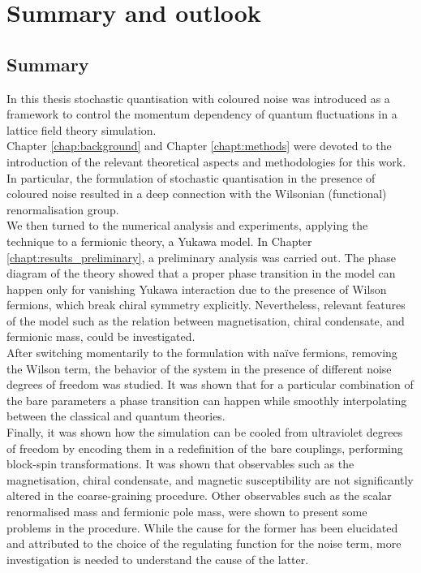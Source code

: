 
\chapter{Summary and outlook}
\label{chap:conclusions}
\section*{Summary}
In this thesis stochastic quantisation with coloured noise was introduced as a framework to control the momentum dependency of quantum fluctuations in a lattice field theory simulation. \\
Chapter \ref{chap:background} and Chapter \ref{chapt:methods} were devoted to the introduction of the relevant theoretical aspects and methodologies for this work. In particular, the formulation 
of stochastic quantisation in the presence of coloured noise resulted in a deep connection with the Wilsonian (functional) renormalisation group. \\
We then turned to the numerical analysis and experiments, applying the technique to a fermionic theory, a Yukawa model. In Chapter \ref{chapt:results_preliminary}, a preliminary analysis was carried out. The phase diagram of the theory showed that a proper phase transition in the model can happen only for vanishing Yukawa interaction due to the presence of Wilson 
fermions, which break chiral symmetry explicitly. Nevertheless, relevant features of the model such as the relation between magnetisation, chiral condensate, and fermionic mass, could be investigated. \\
After switching momentarily to the formulation with na\"ive fermions, removing the Wilson term, the behavior of the system in the presence of different noise degrees of freedom was studied. It was shown that for a particular combination of the bare parameters
a phase transition can happen while smoothly interpolating between the classical and quantum theories. \\
Finally, it was shown how the simulation can be cooled from ultraviolet degrees of freedom by encoding them in a redefinition of the bare couplings, performing block-spin transformations. It was shown that observables such as the magnetisation, chiral condensate, and magnetic susceptibility are not significantly altered in the coarse-graining procedure.
Other observables such as the scalar renormalised mass and fermionic pole mass, were shown to present some problems in the procedure. While the cause for the former has been elucidated and attributed to the choice of the regulating function for the noise term, more investigation is needed to understand the cause of the latter. 
\newpage 
